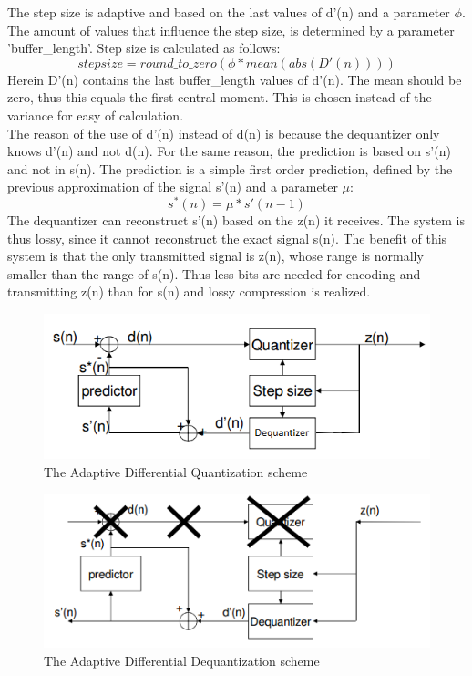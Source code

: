 \documentclass[a4paper]{article}
\begin{document}
The step size is adaptive and based on the last values of d'(n) and a parameter $\phi$. The amount of values that influence the step size, is determined by a parameter 'buffer\_length'. Step size is calculated as follows:
\begin{equation*}
stepsize = round\_to\_zero(\phi*mean(abs(D'(n))))
\end{equation*}
Herein D'(n) contains the last buffer\_length values of d'(n). The mean should be zero, thus this equals the first central moment. This is chosen instead of the variance for easy of calculation. \\
The reason of the use of d'(n) instead of d(n) is because the dequantizer only knows d'(n) and not d(n). For the same reason, the prediction is based on s'(n) and not in s(n). The prediction is a simple first order prediction, defined by the previous approximation of the signal s'(n) and a parameter $\mu$:
\begin{equation*}
s^*(n) = \mu*s'(n-1)
\end{equation*}
The dequantizer can reconstruct s'(n) based on the z(n) it receives. The system is thus lossy, since it cannot reconstruct the exact signal s(n). The benefit of this system is that the only transmitted signal is z(n), whose range is normally smaller than the range of s(n). Thus less bits are needed for encoding and transmitting z(n) than for s(n) and lossy compression is realized.
\begin{figure}[hbt]
\includegraphics[width = \textwidth]{Quantization.png}
\caption{The Adaptive Differential Quantization scheme}
\label{fig:quantization}
\end{figure}
\begin{figure}[hbt]
\includegraphics[width = \textwidth]{Dequantization.png}
\caption{The Adaptive Differential Dequantization scheme}
\label{fig:dequantization}
\end{figure}
\end{document}
